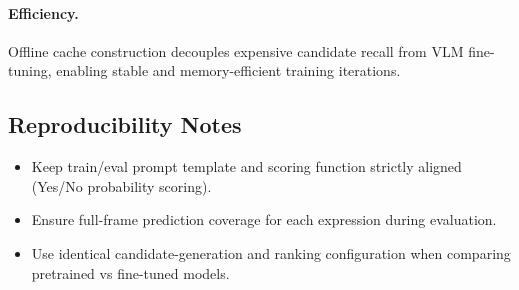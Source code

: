 \paragraph{Efficiency.}
Offline cache construction decouples expensive candidate recall from VLM fine-tuning, enabling stable and memory-efficient training iterations.

\subsection{Reproducibility Notes}
\begin{itemize}
\item Keep train/eval prompt template and scoring function strictly aligned (Yes/No probability scoring).
\item Ensure full-frame prediction coverage for each expression during evaluation.
\item Use identical candidate-generation and ranking configuration when comparing pretrained vs fine-tuned models.
\end{itemize}
